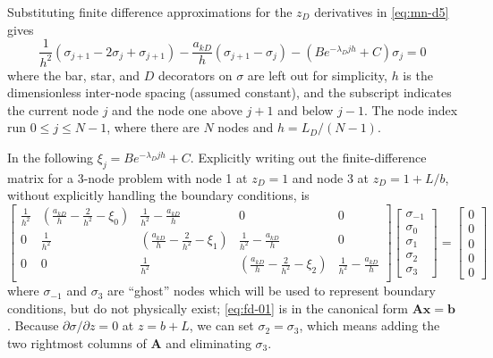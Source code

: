 \documentclass[12pt,letterpaper]{article}
\begin{document}
Substituting finite difference approximations for the $z_D$
derivatives in \eqref{eq:mn-d5} gives
\begin{equation}
  \nonumber
  \frac{1}{h^2} \left( \sigma_{j+1} - 2 \sigma_j + \sigma_{j+1}
  \right) - \frac{a_{kD}}{h} \left( \sigma_{j+1} - \sigma_j\right) -
  \left( B e^{-\lambda_D jh} + C \right) \sigma_j
  = 0
\end{equation}
where the bar, star, and $D$ decorators on $\sigma$ are left out for simplicity, $h$ is
the dimensionless inter-node spacing (assumed constant), and
the subscript indicates the current node $j$ and the node one above
$j+1$ and below $j-1$.  The node index run $0 \le j \le N-1$, where
 there are $N$ nodes and $h = L_D / (N - 1)$.

In the following $\xi_j = B e^{-\lambda_D jh} + C$.
Explicitly writing out the finite-difference matrix for a 3-node
problem with node 1 at $z_D=1$ and node 3 at $z_D=1+L/b$, without
explicitly handling the boundary conditions, is
\begin{equation}
  \label{eq:fd-01}
  \left[ \begin{matrix}
    \frac{1}{h^2} & \left(\frac{a_{kD}}{h} - \frac{2}{h^2} - \xi_0\right) &
    \frac{1}{h^2} - \frac{a_{kD}}{h} & 0 & 0 \\ 
    0 & \frac{1}{h^2} & \left(\frac{a_{kD}}{h} - \frac{2}{h^2} - \xi_1 \right)&
    \frac{1}{h^2} - \frac{a_{kD}}{h} & 0  \\ 
    0 & 0 & \frac{1}{h^2} & \left(\frac{a_{kD}}{h} - \frac{2}{h^2}  -
      \xi_2 \right) &
    \frac{1}{h^2} - \frac{a_{kD}}{h} \\ 
  \end{matrix}\right] 
\left[\begin{matrix}
\sigma_{-1} \\ \sigma_0 \\ \sigma_1 \\ \sigma_2 \\ \sigma_3
\end{matrix}\right]
=
\left[\begin{matrix}
0 \\ 0\\ 0 \\ 0 \\ 0
\end{matrix}\right]
\end{equation}
where $\sigma_{-1}$ and $\sigma_3$ are ``ghost'' nodes
which will be used to represent boundary conditions, but do not
physically exist; \eqref{eq:fd-01} is in the canonical form $\mathbf{Ax}=\mathbf{b}$.  Because
$\partial \sigma/\partial z =0$ at $z = b+L$, we can set $\sigma_2=
\sigma_3$, which means adding the two rightmost columns of
$\mathbf{A}$ and eliminating $\sigma_3$.
\end{document}
